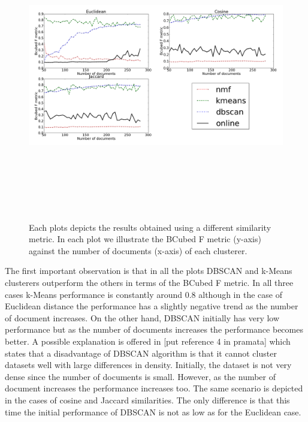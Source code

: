 \begin{figure}[htbp]
  \begin{center}
    \includegraphics[height=5in, width=6in]{number_of_documents}
    \caption{Each plots depicts the results obtained using a different similarity metric. In each plot we illustrate the BCubed F metric (y-axis) against the number of documents (x-axis) of each clusterer.}
    \label{DifferentSizeResults}
  \end{center}
\end{figure}
The first important observation is that in all the plots DBSCAN and k-Means clusterers outperform the others in terms of the BCubed F metric. In all three cases k-Means performance is constantly around 0.8 although in the case of Euclidean distance the performance has a slightly negative trend as the number of document increases. On the other hand, DBSCAN initially has very low performance but as the number of documents increases the performance becomes better. A possible explanation is offered in [put reference 4 in pramata] which states that a disadvantage of DBSCAN algorithm is that it cannot cluster datasets well with large differences in density. Initially, the dataset is not very dense since the number of documents is small. However, as the number of document increases the performance increases too. The same scenario is depicted in the cases of cosine and Jaccard similarities. The only difference is that this time the initial performance of DBSCAN is not as low as for the Euclidean case.\\\\
